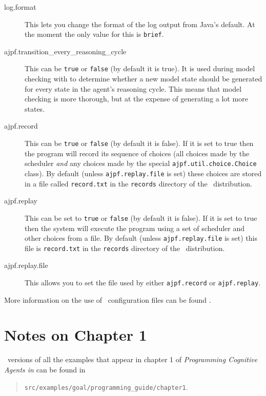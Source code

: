 \begin{sloppypar}
\begin{description}
\item[log.format] This lets you change the format of the log output from Java's default.  At the moment the only value for this is \texttt{brief}.
\item[ajpf.transition\_every\_reasoning\_cycle] This can be \texttt{true} or \texttt{false} (by default it is true).  It is used during model checking with \ajpf{} to determine whether a new model state should be generated for every state in the agent's reasoning cycle.  This means that model checking is more thorough, but at the expense of generating a lot more states.
\item[ajpf.record] This can be \texttt{true} or \texttt{false} (by default  it is false).  If it is set to true then the program will record its sequence of choices (all choices made by the scheduler \emph{and} any choices made by the special \texttt{ajpf.util.choice.Choice} class).  By default (unless \texttt{ajpf.replay.file} is set) these choices are stored in a file called \texttt{record.txt} in the \texttt{records} directory of the \mcapl\ distribution.
\item[ajpf.replay] This can be set to \texttt{true} or \texttt{false} (by default it is false).  If it is set to true then the system will execute the program using a set of scheduler and other choices from a file.  By default (unless \texttt{ajpf.replay.file} is set) this  file is  \texttt{record.txt} in the \texttt{records} directory of the \mcapl\ distribution.
\item[ajpf.replay.file] This allows you to set the file used by either \texttt{ajpf.record} or \texttt{ajpf.replay}.
\end{description}
\end{sloppypar}

More information on the use of \ail\ configuration files can be found .

\section{Notes on Chapter 1}

\ail\ versions of all the examples that appear in chapter 1 of \emph{Programming Cognitive Agents in \goal} can be found in
\begin{quote}
  \texttt{src/examples/goal/programming\_guide/chapter1}.
\end{quote}

